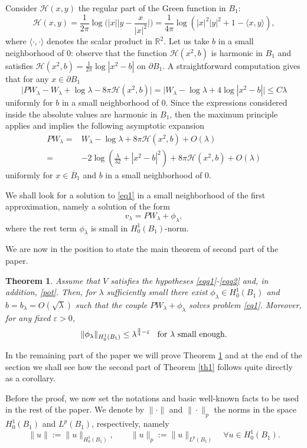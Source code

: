 \documentclass[reqno,11pt]{amsart}
\newtheorem{thm}{Theorem}[section]
\theoremstyle{definition}
\numberwithin{equation}{section}
\newcommand{\cal}{\mathcal }
\newcommand{\R}{\mathbb{R}}
\newcommand{\la}{\lambda}
\newcommand{\e}{\varepsilon}
\renewcommand{\(}{\left(}
\renewcommand{\)}{\right)}
\renewcommand{\[}{\left[}
\renewcommand{\]}{\right]}
\newcommand{\beq}{\begin{equation}}
\newcommand{\eeq}{\end{equation}}
\begin{document}
{Consider ${\cal H}(x,y)$ the  regular part of the Green function in $B_1$:
\beq\label{regG}{\cal H}(x,y)=\frac{1}{2\pi}\log\Big(|x|\Big|y-\frac{x}{|x|^2}\Big|\Big)=\frac{1}{4\pi}\log(|x|^2|y|^2+1-\langle x,y\rangle),
\eeq  where $\langle\cdot,\cdot\rangle$ denotes the scalar product in $\R^2$. 
Let us take $b$ in a small neighborhood of $0$: observe that  the function ${\cal H}(x^2,b)$ is harmonic in $B_1$ and satisfies ${\cal H}(x^2,b)=\frac{1}{2\pi}\log |x^2-b|$ on $\partial B_1$. A straightforward computation gives that for any $x\in\partial B_1$ 
$$\big|PW_\la- W_\la+\log\la-8\pi{\cal H}(x^2,b)\big|=\big|W_\la-\log\la+4\log |x^2-b|
\big|\leq C\la$$
uniformly for $b$ in a small neighborhood of $0$. 
Since the expressions considered inside the absolute values 
are harmonic in $B_1$, then the maximum principle applies and implies
the following asymptotic expansion
\beq\label{pro-exp1}\begin{aligned}
 PW_\la=& W_\la-\log\la+8\pi{\cal H}(x^2,b)+O(\la)\\ =&-2\log\(\frac{\la}{32}+|x^{2}- b|^2\)+8\pi{\cal H}(x^2,b)+O(\la)
\end{aligned}\eeq 
uniformly for $x\in \overline B_1$ and $b $ in a small neighborhood of $0$.  


We shall look for a solution to \eqref{eq1} in a small neighborhood of the first approximation, namely a solution of the form
 $$v_\la=PW_\la
 + {\phi}_\la,$$ where the rest term
$\phi_\la$ is small in
$H^1_0(B_1)$-norm.



We are now in the position to state  the main theorem of second part of the paper.

\begin{thm} \label{main1} Assume that $V$ satisfies the hypotheses \eqref{eqq1}-\eqref{eqq2} and, in addition, \eqref{pot}. Then, for $\la$ sufficiently small  there
exist  $\phi_\la \in H^1_0(B_1)$ and $b=b_\la=O(\sqrt\la)$ such that the couple $
PW_\la+\phi_\la$ solves problem
\eqref{eq1}.
Moreover, for any fixed $\e>0$,
$$\| \phi_\la \|_{H^1_0(B_1)}\leq \la^{\frac34-\e}\;\;\hbox{ for } \la \hbox{ small enough}.$$
\end{thm}


In the remaining part of the paper we will prove Theorem \ref{main1} and at the end of the section  we shall see how the second part of Theorem \ref{th1} follows quite directly as a corollary. 

Before the proof, we now set the notations and basic well-known
facts to be used in the rest of the paper. We denote by  $\|\cdot\|$ and $\|\cdot\|_p$  the norms in  the space $ H^1_0(B_1)$ and $L^p(B_1)$, respectively, namely
 $$\|u\|:=\|u\|_{ H^1_0(B_1)}
 ,\qquad \|u\|_p:=\|u\|_{L^p(B_1)}
 \quad \forall u\in  H^1_0(B_1).$$


}
\end{document}
